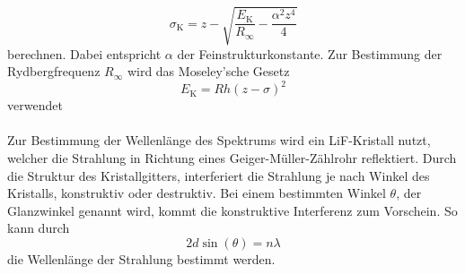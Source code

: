 \begin{equation}
    \sigma_ \text{K} = z - \sqrt{\frac{E_\text{K}}{R_\infty} - \frac{\alpha^2 z^4}{4}}
    \label{eq:sigma}
\end{equation}
berechnen.
Dabei entspricht $\alpha$ der Feinstrukturkonstante.
Zur Bestimmung der Rydbergfrequenz $R_\infty$ wird das Moseley'sche Gesetz
\begin{equation}
    E_\text{K} = R h (z - \sigma )^2
    \label{eqn:moseley}
\end{equation}
verwendet
\\\\
Zur Bestimmung der Wellenlänge des Spektrums wird ein LiF-Kristall nutzt, welcher die Strahlung in Richtung eines Geiger-Müller-Zählrohr reflektiert.
Durch die Struktur des Kristallgitters, interferiert die Strahlung je nach Winkel des Kristalls, konstruktiv oder destruktiv.
Bei einem bestimmten Winkel $\theta$, der Glanzwinkel genannt wird, kommt die konstruktive Interferenz zum Vorschein.
So kann durch
\begin{equation}
    2d\sin(\theta) = n \lambda
    \label{eq:bragg}
\end{equation}
die Wellenlänge der Strahlung bestimmt werden.



